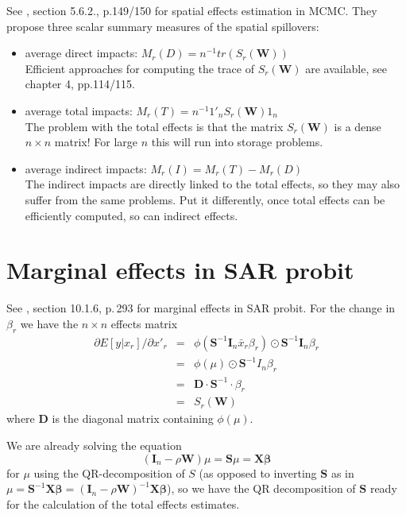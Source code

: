 \documentclass[a4paper]{article}
\def\bfbeta{\mbox{$\boldsymbol{\beta}$}}
\def\bfD{\mbox{$\boldsymbol{\mathbf{D}}$}}
\def\bfI{\mbox{$\boldsymbol{\mathbf{I}}$}}
\def\bfS{\mbox{$\boldsymbol{\mathbf{S}}$}}
\def\bfW{\mbox{$\boldsymbol{\mathbf{W}}$}}
\def\bfX{\mbox{$\boldsymbol{\mathbf{X}}$}}
\begin{document}
See \cite{LeSage2009}, section 5.6.2., p.149/150 for spatial effects estimation in MCMC. They propose three scalar summary
measures of the spatial spillovers:
\begin{itemize}
\item average direct impacts: $M_r(D) = n^{-1} tr(S_r(\bfW))$      \\
Efficient approaches for computing the trace of $S_r(\bfW)$ are available, see \cite{LeSage2009} chapter 4, pp.114/115.
\item average total impacts: $M_r(T) = n^{-1} 1'_n S_r(\bfW) 1_n$  \\
 The problem with the total effects is that the matrix $S_r(\bfW)$ is a dense $n \times n$ matrix! 
 For large $n$ this will run into storage problems.
\item average indirect impacts: $M_r(I) = M_r(T) - M_r(D)$\\
 The indirect impacts are directly linked to the total effects, so they may also suffer from the same problems.
 Put it differently, once total effects can be efficiently computed, so can indirect effects.
\end{itemize}

\section{Marginal effects in SAR probit}

See \cite{LeSage2009}, section 10.1.6, p.\,293 for marginal effects in SAR probit.
For the change in $\beta_r$ we have the $n \times n$ effects matrix
\begin{eqnarray}
 \partial E[y | x_r] / \partial x'_r & = & \phi(\bfS^{-1} \bfI_n \bar{x}_r \beta_r) \odot \bfS^{-1} \bfI_n \beta_r \\
                                     & = & \phi(\mu) \odot \bfS^{-1} I_n \beta_r \nonumber \\
                                     & = & \bfD \cdot \bfS^{-1} \cdot \beta_r \nonumber \\
                                     & = & S_r(\bfW) \nonumber  
\end{eqnarray}
where $\bfD$ is the diagonal matrix containing $\phi(\mu)$.\\
\par
We are already solving the equation 
\begin{equation}
  (\bfI_n - \rho \bfW) \mu = \bfS \mu = \bfX \bfbeta \nonumber
\end{equation}   
for $\mu$ using the QR-decomposition of $S$
(as opposed to inverting $\bfS$ as in $\mu = \bfS^{-1} \bfX \bfbeta = (\bfI_n -  \rho \bfW)^{-1} \bfX \bfbeta$),
so we have the QR decomposition of $\bfS$ ready for the calculation of the total effects estimates.
\end{document}
